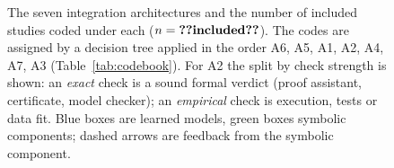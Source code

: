 \begin{figure}[t]
\caption{The seven integration architectures and the number of included studies coded under each ($n=\cnt{included}$). The codes are assigned by a decision tree applied in the order A6, A5, A1, A2, A4, A7, A3 (Table~\ref{tab:codebook}). For A2 the split by check strength is shown: an \emph{exact} check is a sound formal verdict (proof assistant, certificate, model checker); an \emph{empirical} check is execution, tests or data fit. Blue boxes are learned models, green boxes symbolic components; dashed arrows are feedback from the symbolic component.}
\label{fig:architectures}
\end{figure}
